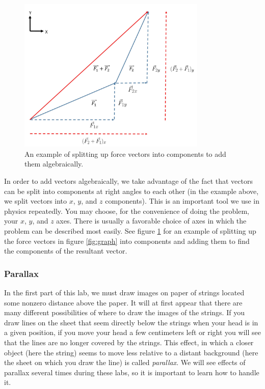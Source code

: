 \begin{figure}[h]
    \begin{center}
        \includegraphics[width=0.8\textwidth, height=0.6\textwidth]{./Exp1-4/pic/image12.jpg}
    \end{center}
    \caption{An example of splitting up force vectors into components to add them algebraically.}
    \label{fig:add}
\end{figure}

In order to add vectors algebraically, we take advantage of the fact that vectors can be split into components at right angles to each other (in the example above, we split vectors into $x$, $y$, and $z$ components). This is an important tool we use in physics repeatedly. You may choose, for the convenience of doing the problem, your $x$, $y$, and $z$ axes. There is usually a favorable choice of axes in which the problem can be described most easily. See figure \ref{fig:add} for an example of splitting up the force vectors in figure \ref{fig:graph} into components and adding them to find the components of the resultant vector.

\subsubsection{Parallax}

In the first part of this lab, we must draw images on paper of strings located some nonzero distance above the paper. It will at first appear that there are many different possibilities of where to draw the images of the strings. If you draw lines on the sheet that seem directly below the strings when your head is in a given position, if you move your head a few centimeters left or right you will see that the lines are no longer covered by the strings. This effect, in which a closer object (here the string) seems to move less relative to a distant background (here the sheet on which you draw the line) is called \emph{parallax}. We will see effects of parallax several times during these labs, so it is important to learn how to handle it. \myskip

